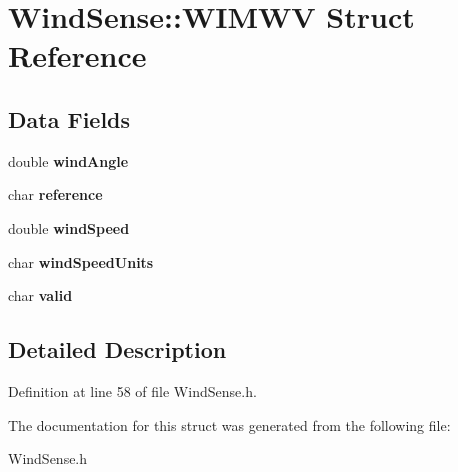 \hypertarget{structWindSense_1_1WIMWV}{
\section{\-Wind\-Sense\-:\-:\-W\-I\-M\-W\-V \-Struct \-Reference}
\label{structWindSense_1_1WIMWV}
}
\subsection*{\-Data \-Fields}
\begin{DoxyCompactItemize}
\item 
\hypertarget{structWindSense_1_1WIMWV_a24bff21695b80eb0f00580f6a58fd972}{
double {\bfseries wind\-Angle}}
\label{structWindSense_1_1WIMWV_a24bff21695b80eb0f00580f6a58fd972}

\item 
\hypertarget{structWindSense_1_1WIMWV_aab03ac8cb967677eba6a98ac5b8e04e2}{
char {\bfseries reference}}
\label{structWindSense_1_1WIMWV_aab03ac8cb967677eba6a98ac5b8e04e2}

\item 
\hypertarget{structWindSense_1_1WIMWV_a8a92124fd0443176c80be219e3c122ad}{
double {\bfseries wind\-Speed}}
\label{structWindSense_1_1WIMWV_a8a92124fd0443176c80be219e3c122ad}

\item 
\hypertarget{structWindSense_1_1WIMWV_a95dd9d1e5796d983056b9d33fe78baf2}{
char {\bfseries wind\-Speed\-Units}}
\label{structWindSense_1_1WIMWV_a95dd9d1e5796d983056b9d33fe78baf2}

\item 
\hypertarget{structWindSense_1_1WIMWV_a70cdbb1abfa0cb7c4aad6cf973b87306}{
char {\bfseries valid}}
\label{structWindSense_1_1WIMWV_a70cdbb1abfa0cb7c4aad6cf973b87306}

\end{DoxyCompactItemize}


\subsection{\-Detailed \-Description}


\-Definition at line 58 of file \-Wind\-Sense.\-h.



\-The documentation for this struct was generated from the following file\-:\begin{DoxyCompactItemize}
\item 
\-Wind\-Sense.\-h\end{DoxyCompactItemize}
